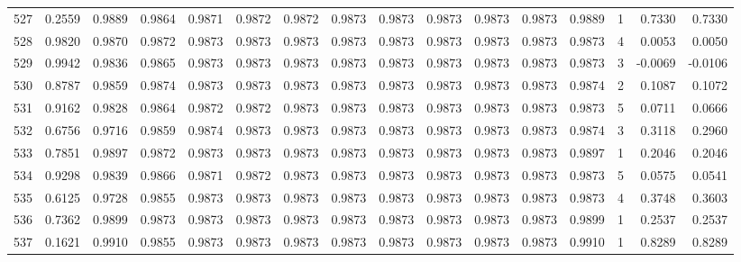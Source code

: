\begin{tabular}{lrrrrrrrrrrrrrrr}
527 &      0.2559 &  0.9889 &  0.9864 &  0.9871 &  0.9872 &  0.9872 &  0.9873 &  0.9873 &  0.9873 &  0.9873 &   0.9873 &     0.9889 &      1 &                    0.7330 &                     0.7330 \\
528 &      0.9820 &  0.9870 &  0.9872 &  0.9873 &  0.9873 &  0.9873 &  0.9873 &  0.9873 &  0.9873 &  0.9873 &   0.9873 &     0.9873 &      4 &                    0.0053 &                     0.0050 \\
529 &      0.9942 &  0.9836 &  0.9865 &  0.9873 &  0.9873 &  0.9873 &  0.9873 &  0.9873 &  0.9873 &  0.9873 &   0.9873 &     0.9873 &      3 &                   -0.0069 &                    -0.0106 \\
530 &      0.8787 &  0.9859 &  0.9874 &  0.9873 &  0.9873 &  0.9873 &  0.9873 &  0.9873 &  0.9873 &  0.9873 &   0.9873 &     0.9874 &      2 &                    0.1087 &                     0.1072 \\
531 &      0.9162 &  0.9828 &  0.9864 &  0.9872 &  0.9872 &  0.9873 &  0.9873 &  0.9873 &  0.9873 &  0.9873 &   0.9873 &     0.9873 &      5 &                    0.0711 &                     0.0666 \\
532 &      0.6756 &  0.9716 &  0.9859 &  0.9874 &  0.9873 &  0.9873 &  0.9873 &  0.9873 &  0.9873 &  0.9873 &   0.9873 &     0.9874 &      3 &                    0.3118 &                     0.2960 \\
533 &      0.7851 &  0.9897 &  0.9872 &  0.9873 &  0.9873 &  0.9873 &  0.9873 &  0.9873 &  0.9873 &  0.9873 &   0.9873 &     0.9897 &      1 &                    0.2046 &                     0.2046 \\
534 &      0.9298 &  0.9839 &  0.9866 &  0.9871 &  0.9872 &  0.9873 &  0.9873 &  0.9873 &  0.9873 &  0.9873 &   0.9873 &     0.9873 &      5 &                    0.0575 &                     0.0541 \\
535 &      0.6125 &  0.9728 &  0.9855 &  0.9873 &  0.9873 &  0.9873 &  0.9873 &  0.9873 &  0.9873 &  0.9873 &   0.9873 &     0.9873 &      4 &                    0.3748 &                     0.3603 \\
536 &      0.7362 &  0.9899 &  0.9873 &  0.9873 &  0.9873 &  0.9873 &  0.9873 &  0.9873 &  0.9873 &  0.9873 &   0.9873 &     0.9899 &      1 &                    0.2537 &                     0.2537 \\
537 &      0.1621 &  0.9910 &  0.9855 &  0.9873 &  0.9873 &  0.9873 &  0.9873 &  0.9873 &  0.9873 &  0.9873 &   0.9873 &     0.9910 &      1 &                    0.8289 &                     0.8289 \\

\end{tabular}
